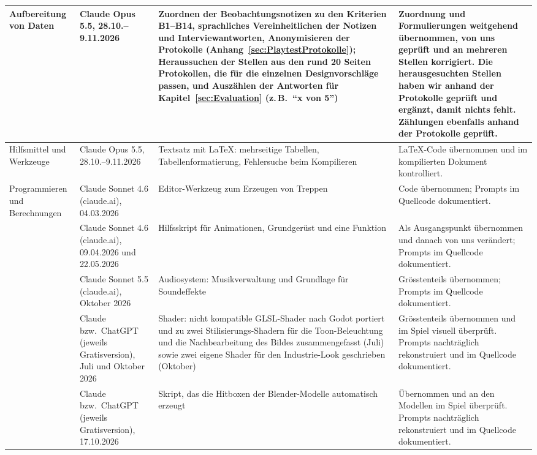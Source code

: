 \documentclass[../Main.tex]{subfiles}
\begin{document}
{\begin{longtable}{|>{\raggedright\arraybackslash}p{2.3cm}|>{\raggedright\arraybackslash}p{2.4cm}|>{\raggedright\arraybackslash}p{4.4cm}|>{\raggedright\arraybackslash}p{4.6cm}|}
        \hline
        Aufbereitung von Daten & Claude Opus 5.5, 28.10.--9.11.2026 & Zuordnen der Beobachtungsnotizen zu den Kriterien B1--B14, sprachliches Vereinheitlichen der Notizen und Interviewantworten, Anonymisieren der Protokolle (Anhang~\ref{sec:PlaytestProtokolle}); Heraussuchen der Stellen aus den rund 20 Seiten Protokollen, die für die einzelnen Designvorschläge passen, und Auszählen der Antworten für Kapitel~\ref{sec:Evaluation} (z.\,B.\ \enquote{x von 5}) & Zuordnung und Formulierungen weitgehend übernommen, von uns geprüft und an mehreren Stellen korrigiert. Die herausgesuchten Stellen haben wir anhand der Protokolle geprüft und ergänzt, damit nichts fehlt. Zählungen ebenfalls anhand der Protokolle geprüft. \\
        \hline
        Hilfsmittel und Werkzeuge & Claude Opus 5.5, 28.10.--9.11.2026 & Textsatz mit \LaTeX: mehrseitige Tabellen, Tabellenformatierung, Fehlersuche beim Kompilieren & \LaTeX-Code übernommen und im kompilierten Dokument kontrolliert. \\
        \hline
        Programmieren und Berechnungen & Claude Sonnet 4.6 (claude.ai), 04.03.2026 & Editor-Werkzeug zum Erzeugen von Treppen & Code übernommen; Prompts im Quellcode dokumentiert. \\
        \hline
        & Claude Sonnet 4.6 (claude.ai), 09.04.2026 und 22.05.2026 & Hilfsskript für Animationen, Grundgerüst und eine Funktion & Als Ausgangspunkt übernommen und danach von uns verändert; Prompts im Quellcode dokumentiert. \\
        \hline
        & Claude Sonnet 5.5 (claude.ai), Oktober 2026 & Audiosystem: Musikverwaltung und Grundlage für Soundeffekte & Grösstenteils übernommen; Prompts im Quellcode dokumentiert. \\
        \hline
        & Claude bzw.\ ChatGPT (jeweils Gratisversion), Juli und Oktober 2026 & Shader: nicht kompatible GLSL-Shader nach Godot portiert und zu zwei Stilisierungs-Shadern für die Toon-Beleuchtung und die Nachbearbeitung des Bildes zusammengefasst (Juli) sowie zwei eigene Shader für den Industrie-Look geschrieben (Oktober) & Grösstenteils übernommen und im Spiel visuell überprüft. Prompts nachträglich rekonstruiert und im Quellcode dokumentiert. \\
        \hline
        & Claude bzw.\ ChatGPT (jeweils Gratisversion), 17.10.2026 & Skript, das die Hitboxen der Blender-Modelle automatisch erzeugt & Übernommen und an den Modellen im Spiel überprüft. Prompts nachträglich rekonstruiert und im Quellcode dokumentiert. \\

\end{longtable}}
\end{document}
